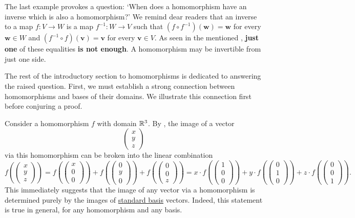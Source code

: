The last example provokes a question: `When does a homomorphism have an inverse
which is also a homomorphism?' We remind dear readers that an inverse to a map
$f:V \to W$ is a map $f^{-1}:W \to V$ such that $(f \circ f^{-1})(\mathbf{w}) =
\mathbf{w}$ for every $\mathbf{w} \in W$ and $(f^{-1} \circ f)(\mathbf{v}) =
\mathbf{v}$ for every $\mathbf{v} \in V$. As seen in the mentioned
, \textbf{just one} of these equalities \textbf{is
not enough}. A homomorphism may be invertible from just one side.

The rest of the introductory section to homomorphisms is dedicated to answering
the raised question. First, we must establish a strong connection between
homomorphisms and bases of their domains. We illustrate this connection first
before conjuring a proof.

Consider a homomorphism $f$ with domain $\mathbb{R}^3$. By
, the image of a vector
\[
 \begin{pmatrix}
  x\\
  y\\
  z
 \end{pmatrix}
\]
via this homomorphism can be broken into the linear combination
\[
 f \left( 
 \begin{pmatrix}
  x\\
  y\\
  z
 \end{pmatrix}
 \right) = f \left( 
 \begin{pmatrix}
  x\\
  0\\
  0
 \end{pmatrix}
 \right) + f \left( 
 \begin{pmatrix}
  0\\
  y\\
  0
 \end{pmatrix}
 \right) + f \left( 
 \begin{pmatrix}
  0\\
  0\\
  z
 \end{pmatrix}
 \right) = x \cdot 
 f \left( 
 \begin{pmatrix}
  1\\
  0\\
  0
 \end{pmatrix}
 \right) + y \cdot f \left(
 \begin{pmatrix}
  0\\
  1\\
  0
 \end{pmatrix}
 \right) + z \cdot f \left( 
 \begin{pmatrix}
  0\\
  0\\
  1
 \end{pmatrix}
 \right).
\]
This immediately suggests that the image of any vector via a homomorphism is
determined purely by the images of \hyperref[def:standard-basis]{standard basis}
vectors. Indeed, this statement is true in general, for any homomorphism and any
basis.

